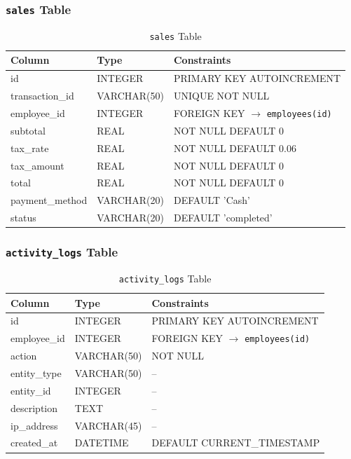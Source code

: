 \subsubsection*{\texttt{sales} Table}

\begin{table}[h]
  \centering
  \caption{\texttt{sales} Table}
  \begin{tabular}{p{3cm} p{3cm} p{6cm}}
    \toprule
    \textbf{Column} & \textbf{Type} & \textbf{Constraints} \\
    \midrule
    id             & INTEGER     & PRIMARY KEY AUTOINCREMENT \\
    transaction\_id & VARCHAR(50) & UNIQUE NOT NULL \\
    employee\_id   & INTEGER     & FOREIGN KEY $\rightarrow$ \texttt{employees(id)} \\
    subtotal       & REAL        & NOT NULL DEFAULT 0 \\
    tax\_rate      & REAL        & NOT NULL DEFAULT 0.06 \\
    tax\_amount    & REAL        & NOT NULL DEFAULT 0 \\
    total          & REAL        & NOT NULL DEFAULT 0 \\
    payment\_method & VARCHAR(20) & DEFAULT 'Cash' \\
    status         & VARCHAR(20) & DEFAULT 'completed' \\
    \bottomrule
  \end{tabular}
\end{table}

\subsubsection*{\texttt{activity\_logs} Table}

\begin{table}[h]
  \centering
  \caption{\texttt{activity\_logs} Table}
  \begin{tabular}{p{3cm} p{3cm} p{6cm}}
    \toprule
    \textbf{Column} & \textbf{Type} & \textbf{Constraints} \\
    \midrule
    id          & INTEGER     & PRIMARY KEY AUTOINCREMENT \\
    employee\_id & INTEGER    & FOREIGN KEY $\rightarrow$ \texttt{employees(id)} \\
    action      & VARCHAR(50) & NOT NULL \\
    entity\_type & VARCHAR(50) & -- \\
    entity\_id  & INTEGER     & -- \\
    description & TEXT        & -- \\
    ip\_address & VARCHAR(45) & -- \\
    created\_at & DATETIME    & DEFAULT CURRENT\_TIMESTAMP \\
    \bottomrule
  \end{tabular}
\end{table}

